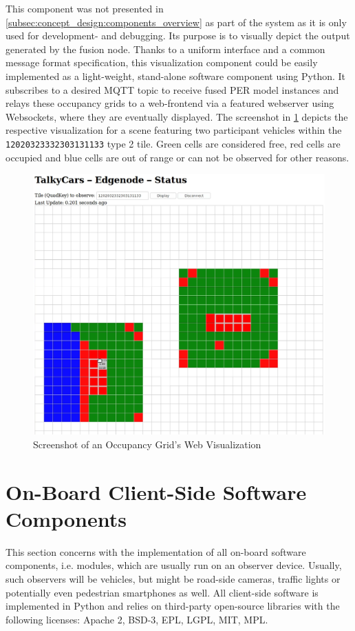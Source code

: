 This component was not presented in \cref{subsec:concept_design:components_overview} as part of the system as it is only used for development- and debugging. Its purpose is to visually depict the output generated by the fusion node. Thanks to a uniform interface and a common message format specification, this visualization component could be easily implemented as a light-weight, stand-alone software component using Python. It subscribes to a desired MQTT topic to receive fused PER model instances and relays these occupancy grids to a web-frontend via a featured webserver using Websockets, where they are eventually displayed. The screenshot in \cref{fig:screenshot_web_node} depicts the respective visualization for a scene featuring two participant vehicles within the \texttt{12020323332303131133} type 2 tile. Green cells are considered free, red cells are occupied and blue cells are out of range or can not be observed for other reasons.

\begin{figure}[h]
	\centering
	\includegraphics[width=0.8\linewidth]{98_images/screenshot_web_node}
	\caption{Screenshot of an Occupancy Grid's Web Visualization}
	\label{fig:screenshot_web_node}
\end{figure}

\section{On-Board Client-Side Software Components}
\label{sec:implementation:on_board_client_side_software_components}
This section concerns with the implementation of all on-board software components, i.e. modules, which are usually run on an observer device. Usually, such observers will be vehicles, but might be road-side cameras, traffic lights or potentially even pedestrian smartphones as well. All client-side software is implemented in Python and relies on third-party open-source libraries with the following licenses: Apache 2, BSD-3, EPL, LGPL, MIT, MPL. 

